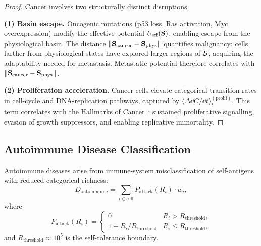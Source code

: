 \begin{proof}
Cancer involves two structurally distinct disruptions.

\textbf{(1) Basin escape.}  Oncogenic mutations (p53 loss, Ras activation,
Myc overexpression) modify the effective potential $U_{\mathrm{eff}}(\mathbf{S})$,
enabling escape from the physiological basin.  The distance
$\|\mathbf{S}_{\mathrm{cancer}} - \mathbf{S}_{\mathrm{phys}}\|$ quantifies
malignancy: cells farther from physiological states have explored larger
regions of $\mathcal{S}$, acquiring the adaptability needed for metastasis.
Metastatic potential therefore correlates with
$\|\mathbf{S}_{\mathrm{cancer}} - \mathbf{S}_{\mathrm{phys}}\|$.

\textbf{(2) Proliferation acceleration.}  Cancer cells elevate categorical
transition rates in cell-cycle and DNA-replication pathways, captured by
$\langle\Delta\dd C/\dd t\rangle_t^{(\mathrm{prolif})}$.  This term
correlates with the Hallmarks of Cancer~\citep{hanahan2011}: sustained
proliferative signalling, evasion of growth suppressors, and enabling
replicative immortality.
\end{proof}

\subsection{Autoimmune Disease Classification}
\label{sec:ch07-autoimmune}

\begin{theorem}
\label{thm:ch07-autoimmune}
Autoimmune diseases arise from immune-system misclassification of self-antigens
with reduced categorical richness:
\begin{equation}
  D_{\mathrm{autoimmune}}
  = \sum_{i \in \mathrm{self}} P_{\mathrm{attack}}(R_i)\cdot w_i,
  \label{eq:ch07-autoimmune}
\end{equation}
where
\begin{equation}
  P_{\mathrm{attack}}(R_i)
  = \begin{cases}
    0 & R_i > R_{\mathrm{threshold}}, \\
    1 - R_i / R_{\mathrm{threshold}} & R_i \leq R_{\mathrm{threshold}},
    \end{cases}
  \label{eq:ch07-attack-prob}
\end{equation}
and $R_{\mathrm{threshold}} \approx 10^5$ is the self-tolerance boundary.
\end{theorem}


